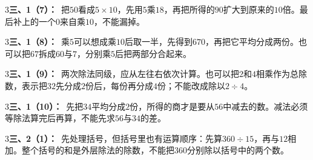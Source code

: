 \documentclass[multi=snippet,border={5bp 20bp 5bp 5bp}]{standalone}
\newenvironment{snippet}[3]{\begin{minipage}{#1bp}\color{answerred}\fontsize{#2}{#3}\selectfont\raggedright}{\end{minipage}}
\begin{document}
\begin{snippet}{505}{11.5}{14}\begin{multicols}{3}\raggedcolumns \textbf{三、1（7）：}\ 把\(50\)\allowbreak 看成\(5\times10\)\allowbreak ，先用\(5\)\allowbreak 乘\(18\)\allowbreak ，再把所得的\(90\)\allowbreak 扩大到原来的\(10\)\allowbreak 倍。最后补上的一个\(0\)\allowbreak 来自乘\(10\)\allowbreak ，不能漏掉。\end{multicols}\end{snippet}
\begin{snippet}{505}{11.5}{14}\begin{multicols}{3}\raggedcolumns \textbf{三、1（8）：}\ 乘\(5\)\allowbreak 可以想成乘\(10\)\allowbreak 后取一半，先得到\(670\)\allowbreak ，再把它平均分成两份。也可以把\(67\)\allowbreak 拆成\(60\)\allowbreak 与\(7\)\allowbreak ，分别乘\(5\)\allowbreak 后把两部分合起来。\end{multicols}\end{snippet}
\begin{snippet}{505}{11.5}{14}\begin{multicols}{3}\raggedcolumns \textbf{三、1（9）：}\ 两次除法同级，应从左往右依次计算。也可以把\(2\)\allowbreak 和\(4\)\allowbreak 相乘作为总除数，表示把\(32\)\allowbreak 先分成\(2\)\allowbreak 份后，每份再分成\(4\)\allowbreak 份；不能改成除以\(2\div4\)\allowbreak 。\end{multicols}\end{snippet}
\begin{snippet}{505}{11.5}{14}\begin{multicols}{3}\raggedcolumns \textbf{三、1（10）：}\ 先把\(34\)\allowbreak 平均分成\(2\)\allowbreak 份，所得的商才是要从\(56\)\allowbreak 中减去的数。减法必须等除法算完后再算，不能先求\(56\)\allowbreak 与\(34\)\allowbreak 的差。\end{multicols}\end{snippet}
\begin{snippet}{505}{11.5}{14}\begin{multicols}{3}\raggedcolumns \textbf{三、2（1）：}\ 先处理括号，但括号里也有运算顺序：先算\(360\div15\)\allowbreak ，再与\(12\)\allowbreak 相加。整个括号的和是外层除法的除数，不能把\(360\)\allowbreak 分别除以括号中的两个数。\end{multicols}\end{snippet}
\end{document}
